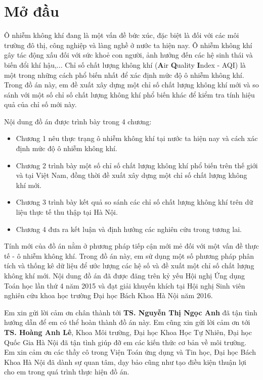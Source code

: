 \documentclass[14pt]{extreport}
\theoremstyle{definition}
\theoremstyle{plain}
\theoremstyle{remark}
\begin{document}
\newpage

\tableofcontents
\newpage

\listoffigures
\listoftables

\newpage
{}
\chapter*{Mở đầu}
Ô nhiễm không khí đang là một vấn đề bức xúc, đặc biệt là đối với các môi trường đô thị, công nghiệp và làng nghề ở nước ta hiện nay. Ô nhiễm không khí gây tác động xấu đối với sức khoẻ con người, ảnh hưởng đến các hệ sinh thái và biến đổi khí hậu,... Chỉ số chất lượng không khí (\textbf{A}ir \textbf{Q}uality \textbf{I}ndex - AQI) là một trong những cách phổ biến nhất để xác định mức độ ô nhiễm không khí. Trong đồ án này, em đề xuất xây dựng một chỉ số chất lượng không khí mới và so sánh với một số chỉ số chất lượng không khí phổ biến khác để kiểm tra tính hiệu quả của chỉ số mới này.

Nội dung đồ án được trình bày trong 4 chương:
\begin{itemize}
\item Chương 1 nêu thực trạng ô nhiễm không khí tại nước ta hiện nay và cách xác định mức độ ô nhiễm không khí.
\item Chương 2 trình bày một số chỉ số chất lượng không khí phổ biến trên thế giới và tại Việt Nam, đồng thời đề xuất xây dựng một chỉ số chất lượng không khí mới.
\item Chương 3 trình bày kết quả so sánh các chỉ số chất lượng không khí trên dữ liệu thực tế thu thập tại Hà Nội.
\item Chương 4 đưa ra kết luận và định hướng các nghiên cứu trong tương lai.
\end{itemize}

Tính mới của đồ án nằm ở phương pháp tiếp cận mới mẻ đối với một vấn đề thực tế - ô nhiễm không khí. Trong đồ án này, em sử dụng một số phương pháp phân tích và thống kê dữ liệu để ước lượng các hệ số và đề xuất một chỉ số chất lượng không khí mới. Nội dung đồ án đã được đăng trên kỷ yếu Hội nghị Ứng dụng Toán học lần thứ 4 năm 2015 và đạt giải khuyến khích tại Hội nghị Sinh viên nghiên cứu khoa học trường Đại học Bách Khoa Hà Nội năm 2016.	

Em xin gửi lời cảm ơn chân thành tới \textbf{TS. Nguyễn Thị Ngọc Anh} đã tận tình hướng dẫn để em có thể hoàn thành đồ án này. Em cũng xin gửi lời cảm ơn tới \textbf{TS. Hoàng Anh Lê}, Khoa Môi trường, Đại học Khoa Học Tự Nhiên, Đại học Quốc Gia Hà Nội đã tận tình giúp đỡ em các kiến thức cơ bản về môi trường. Em xin cảm ơn các thầy cô trong Viện Toán ứng dụng và Tin học, Đại học Bách Khoa Hà Nội đã dành sự quan tâm, dạy bảo cũng như tạo điều kiện thuận lợi cho em trong quá trình thực hiện đồ án.
\end{document}
